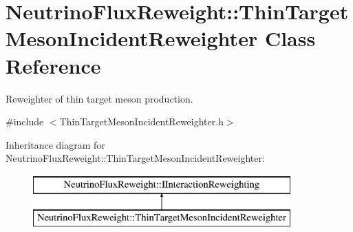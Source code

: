 \hypertarget{class_neutrino_flux_reweight_1_1_thin_target_meson_incident_reweighter}{\section{Neutrino\-Flux\-Reweight\-:\-:Thin\-Target\-Meson\-Incident\-Reweighter Class Reference}
\label{class_neutrino_flux_reweight_1_1_thin_target_meson_incident_reweighter}
}


Reweighter of thin target meson production.  




{\ttfamily \#include $<$Thin\-Target\-Meson\-Incident\-Reweighter.\-h$>$}

Inheritance diagram for Neutrino\-Flux\-Reweight\-:\-:Thin\-Target\-Meson\-Incident\-Reweighter\-:\begin{figure}[H]
\begin{center}
\leavevmode
\includegraphics[height=2.000000cm]{class_neutrino_flux_reweight_1_1_thin_target_meson_incident_reweighter}
\end{center}
\end{figure}
